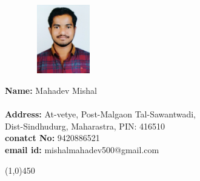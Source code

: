 \documentclass[10pt]{article}
\begin{document}
		\graphicspath{{photos/}}
	\begin{figure}
		\vspace{-20pt}
		\includegraphics[width=3cm,height=3cm]{photo.jpg}
	\end{figure}
\textbf{Name:} Mahadev Mishal\\\\
\textbf{Address:} At-vetye, Post-Malgaon Tal-Sawantwadi,\\
Dist-Sindhudurg, Maharastra, PIN: 416510\\
\textbf{conatct No:} 9420886521\\
\textbf{email id:} mishalmahadev500@gmail.com

\begin{center}
	\line(1,0){450}
\end{center}
\end{document}
